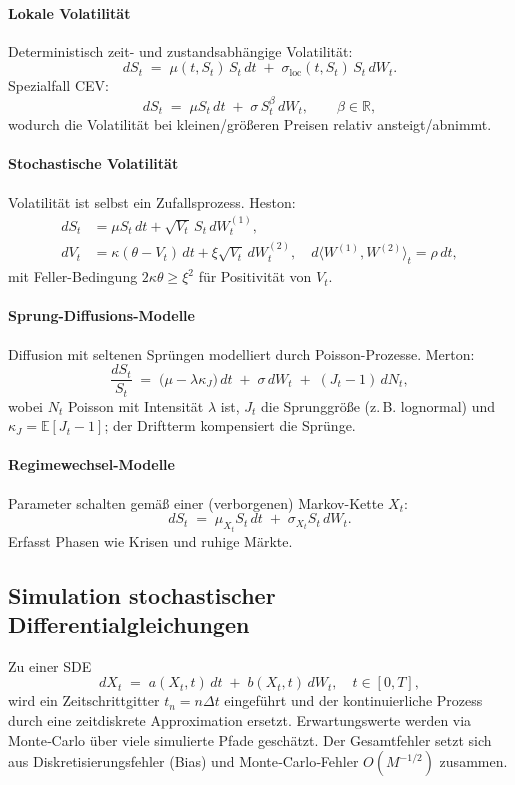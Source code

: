 \paragraph{Lokale Volatilität}
Deterministisch zeit- und zustandsabhängige Volatilität:
$$
dS_t \;=\; \mu(t,S_t)\,S_t\,dt \;+\; \sigma_{\mathrm{loc}}(t,S_t)\,S_t\,dW_t.
$$
Spezialfall CEV:
$$
dS_t \;=\; \mu S_t\,dt \;+\; \sigma\,S_t^{\beta}\,dW_t,\qquad \beta\in\mathbb R,
$$
wodurch die Volatilität bei kleinen/größeren Preisen relativ ansteigt/abnimmt.

\paragraph{Stochastische Volatilität}
Volatilität ist selbst ein Zufallsprozess.
Heston:
$$
\begin{aligned}
dS_t &= \mu S_t\,dt + \sqrt{V_t}\,S_t\,dW_t^{(1)},\\
dV_t &= \kappa(\theta - V_t)\,dt + \xi\sqrt{V_t}\,dW_t^{(2)},\quad d \langle W^{(1)},W^{(2)}\rangle_t=\rho\,dt,
\end{aligned}
$$
mit Feller-Bedingung $2\kappa\theta\ge \xi^2$ für Positivität von $V_t$.

\paragraph{Sprung-Diffusions-Modelle}
Diffusion mit seltenen Sprüngen modelliert durch Poisson-Prozesse.
Merton:
$$
\frac{dS_t}{S_t} \;=\; \big(\mu - \lambda \kappa_J\big)\,dt \;+\; \sigma\,dW_t \;+\; (J_t-1)\,dN_t,
$$
wobei $N_t$ Poisson mit Intensität $\lambda$ ist, $J_t$ die Sprunggröße (z.\,B. lognormal) und $\kappa_J=\mathbb E[J_t-1]$; der Driftterm kompensiert die Sprünge.

\paragraph{Regimewechsel-Modelle}
Parameter schalten gemäß einer (verborgenen) Markov-Kette $X_t$:
$$
dS_t \;=\; \mu_{X_t} S_t\,dt \;+\; \sigma_{X_t} S_t\,dW_t.
$$
Erfasst Phasen wie Krisen und ruhige Märkte.

\subsection{Simulation stochastischer Differentialgleichungen}
Zu einer SDE
$$
dX_t \;=\; a(X_t,t)\,dt \;+\; b(X_t,t)\,dW_t,\quad t\in[0,T],
$$
wird ein Zeitschrittgitter $t_n=n\Delta t$ eingeführt und der kontinuierliche Prozess durch eine zeitdiskrete Approximation ersetzt. Erwartungswerte werden via Monte‑Carlo über viele simulierte Pfade geschätzt. Der Gesamtfehler setzt sich aus Diskretisierungsfehler (Bias) und Monte‑Carlo‑Fehler $O(M^{-1/2})$ zusammen.

